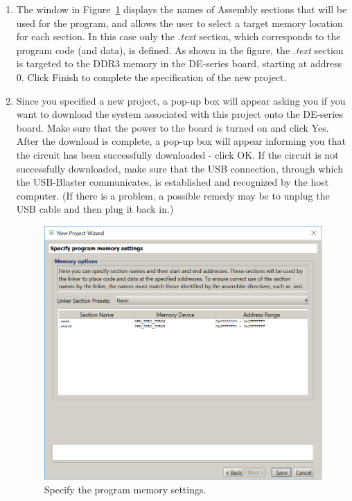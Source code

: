 \documentclass[epsfig,10pt,fullpage]{article}
\begin{document}
\begin{enumerate}
\item The window in Figure~\ref{fig:MP7} displays the names of Assembly sections that will
		  be used for the program, and allows the user to select a target memory location
		  for each section. In this case only the .{\it text} section, which corresponds to
		  the program code (and data), is defined. As shown in the figure, the .{\it text}
		  section is targeted to the DDR3 memory in the DE-series board, starting at
		  address 0. 
Click {\sf Finish} to complete the specification of the new project.

\item Since you specified a new project, a pop-up box will appear asking you if
you want to download the system associated with this project onto the DE-series board.
Make sure that the power to the board is turned on and click {\sf Yes}.
After the download is complete, a pop-up box
will appear informing you that the circuit has been successfully downloaded - click {\sf OK}.
If the circuit is not successfully downloaded, make sure that the USB connection, through 
which the USB-Blaster communicates, is established and recognized by the host computer. 
(If there is a problem, a possible
remedy may be to unplug the USB cable and then plug it back in.)

\begin{figure}[H]
	\begin{center}
	\includegraphics[scale=0.85]{figures/figureMP7.png}
	\end{center}
	\caption{Specify the program memory settings.}
\label{fig:MP7}
\end{figure}


\end{enumerate}
\end{document}
